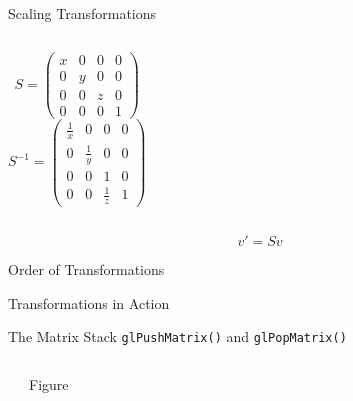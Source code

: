 \documentclass[xcolor=dvipsnames,t]{beamer}
\newcommand{\showcode}[1]{\begin{mdframed}[style=code] %
                          \end{mdframed}%
}
\begin{document}
\begin{frame}{Scaling Transformations} 
    \showcode{scale.c} 
    \begin{columns}[t]
            \begin{equation*}
                S = \left(
                        \begin{array}{cccc}
                            x   & 0     & 0     & 0 \\
                            0   & y     & 0     & 0 \\
                            0   & 0     & z     & 0 \\
                            0   & 0     & 0     & 1
                        \end{array} 
                    \right)
            \end{equation*} 
            \begin{equation*}
               S^{-1} = \left(
                        \begin{array}{cccc}
                            \frac{1}{x} & 0             & 0             & 0 \\
                            0           & \frac{1}{y}   & 0             & 0 \\
                            0           & 0             & 1             & 0 \\
                            0           & 0             & \frac{1}{z}   & 1
                        \end{array} 
                    \right)
            \end{equation*} 
    \end{columns} 
    \begin{equation*}
        v' = S v
    \end{equation*} 
\end{frame} 

\begin{frame}{Order of Transformations}
\end{frame} 

\begin{frame}{Transformations in Action}
\end{frame} 

\begin{frame}{The Matrix Stack} 
    \texttt{glPushMatrix()} and \texttt{glPopMatrix()} 
    \begin{columns}[t]
        \showcode{matrixstack.c} 
        Figure
    \end{columns} 
\end{frame} 
\end{document}
